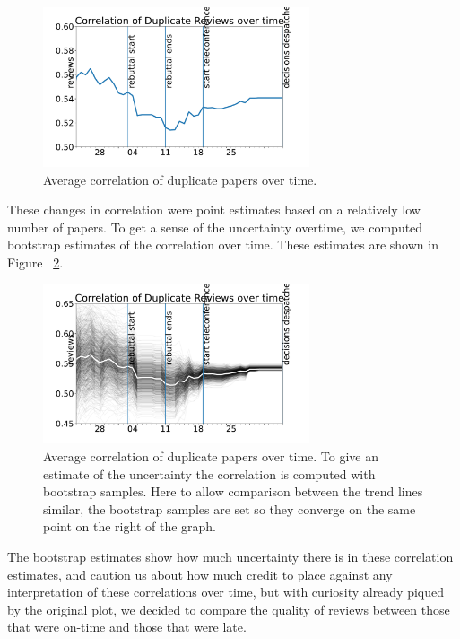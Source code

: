 \begin{figure}[htb]
\centering
\includegraphics[width=0.70\textwidth]{diagrams/neurips/correlation-duplicate-reviews.pdf}


\caption{Average correlation of duplicate papers over time.}
\label{correlation-duplicate-reviews}
\end{figure}

These changes in correlation were point estimates based on a relatively low number of papers. To get a sense of the uncertainty overtime, we computed bootstrap estimates of the correlation over time. These estimates are shown in Figure~ \ref{correlation-duplicate-reviews-bootstrap}.

\begin{figure}[htb]
\centering
\includegraphics[width=0.70\textwidth]{diagrams/neurips/correlation-duplicate-reviews-bootstrap.pdf}


\caption{Average correlation of duplicate papers over time. To give an estimate of the uncertainty the correlation is computed with bootstrap samples. Here to allow comparison between the trend lines similar, the bootstrap samples are set so they converge on the same point on the right of the graph.}
\label{correlation-duplicate-reviews-bootstrap}
\end{figure}

The bootstrap estimates show how much uncertainty there is in these correlation estimates, and caution us about how much credit to place against any interpretation of these correlations over time, but with curiosity already piqued by the original plot, we decided to compare the quality of reviews between those that were on-time and those that were late.

